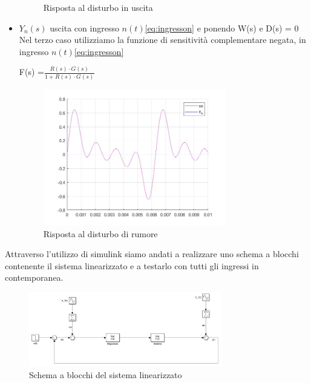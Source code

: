 \documentclass[a4paper, 11pt]{article}
\begin{document}
\begin{itemize}
\begin{figure}[H]
    \caption{Risposta al disturbo in uscita}
\end{figure}
\item $Y_n (s)$ uscita con ingresso $n(t)$\eqref{eq:ingresson} e ponendo W(s) e D(s) = 0\\
Nel terzo caso utilizziamo la funzione di sensitività complementare negata, in ingresso $n(t)$\eqref{eq:ingresson}
\begin{center}
F(s) =$ \frac{R(s) \cdot G(s)}{1+ R(s) \cdot G(s)} $
\end{center}
 \begin{figure}[H]
    \centering
    \includegraphics[width=0.75\textwidth]{immagini/disturborumore.jpg}
    \caption{Risposta al disturbo di rumore}
\end{figure}
\end{itemize}

Attraverso l'utilizzo di simulink siamo andati a realizzare uno schema a blocchi contenente il sistema linearizzato e a testarlo con tutti gli ingressi in contemporanea.
\\
\begin{figure}[H]
    \centering
    \includegraphics[width=0.75\textwidth]{immagini/simulink_sistema_linearizzato.jpg}
    \caption{Schema a blocchi del sistema linearizzato}
    \label{sys_linearizzato}
\end{figure}
\end{document}
